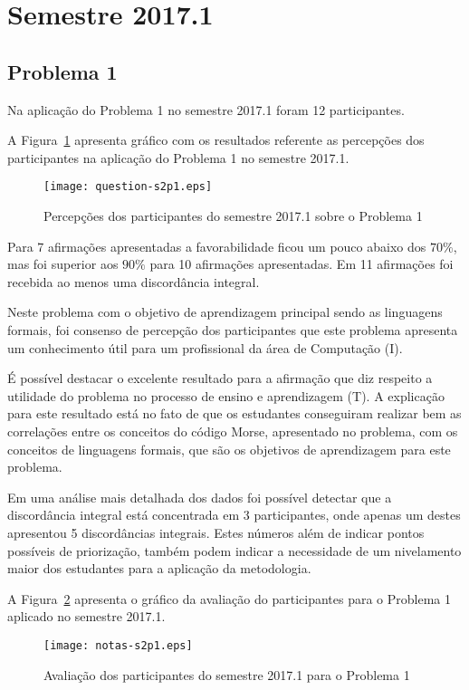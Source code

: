 \section{Semestre 2017.1}
\label{sec-sem-2017}

\subsection{Problema 1}
\label{sec-2017-p1}
Na aplicação do Problema 1 no semestre 2017.1 foram 12 participantes.

A Figura~\ref{percep-s2p1} apresenta gráfico com os resultados referente
as percepções dos participantes na aplicação do
Problema 1 no semestre 2017.1.

\begin{figure}[!htb]
\centering
\texttt{[image: question-s2p1.eps]}
\caption{Percepções dos participantes do semestre 2017.1 sobre o Problema 1}
\label{percep-s2p1}
\end{figure}

Para 7 afirmações apresentadas a favorabilidade ficou um pouco abaixo dos $70\%$, mas
foi superior aos $90\%$ para 10 afirmações apresentadas.
Em 11 afirmações foi recebida ao menos uma discordância integral.

Neste problema com o objetivo de aprendizagem principal sendo
as linguagens formais, foi consenso de percepção dos participantes que
este problema apresenta um conhecimento útil para um profissional
da área de Computação (I).

É possível destacar o excelente resultado para a afirmação que diz respeito a
utilidade do problema no processo de ensino e aprendizagem (T).
A explicação para este resultado está no fato de que os estudantes
conseguiram realizar bem as correlações entre os conceitos
do código Morse, apresentado no problema, com os conceitos de
linguagens formais, que são os objetivos de aprendizagem para
este problema.

Em uma análise mais detalhada dos dados foi possível
detectar que a discordância integral está concentrada
em 3 participantes, onde apenas um destes apresentou
5 discordâncias integrais.
Estes números além de indicar pontos possíveis de
priorização, também podem indicar a necessidade
de um nivelamento maior dos estudantes para a aplicação
da metodologia.

A Figura~\ref{aval-s2p1} apresenta o gráfico da
avaliação do participantes para o Problema 1 aplicado no semestre 2017.1.

\begin{figure}[!htb]
\centering
\texttt{[image: notas-s2p1.eps]}
\caption{Avaliação dos participantes do semestre 2017.1 para o Problema 1}
\label{aval-s2p1}
\end{figure}

